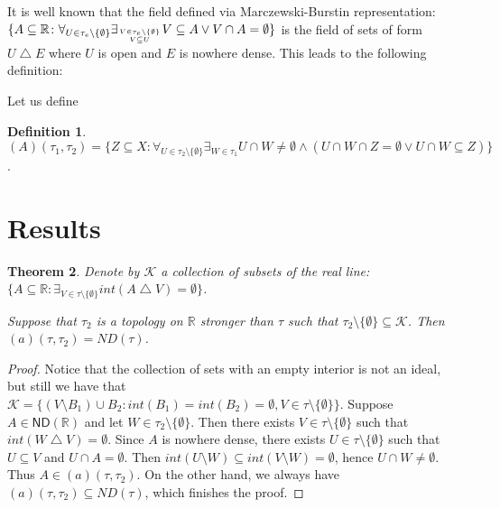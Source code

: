 \documentclass[12pt]{amsart}
\theoremstyle{plain}
\newtheorem{theorem}{Theorem}[section]
\theoremstyle{definition}
\newtheorem{definition}[theorem]{Definition}
\theoremstyle{remark}
\newcommand{\real}{\mathbb{R}}
\newcommand{\cK}{{\mathcal K}}
\newcommand{\mathint}{\mathit{int}}
\newcommand{\aideal}{\mathit{(a)}}
\newcommand{\topWithoutEmptyset}[1]{#1\setminus\lbrace\emptyset\rbrace}
\begin{document}
It is well known that the field defined via
Marczewski-Burstin representation:
$\lbrace A \subseteq \real\colon 
\forall_{U \in \tau_e \setminus \lbrace \emptyset \rbrace}
\exists_{V \in \tau_e \setminus \lbrace \emptyset \rbrace \atop V \subseteq U}
V \subseteq A \vee V \cap A = \emptyset\rbrace$
is the field of sets of form $U \bigtriangleup E$
where $U$ is open and $E$ is nowhere dense.
This leads to the following definition:

Let us define 
\begin{definition}
$(A)(\tau_1, \tau_2) = \{ Z \subseteq X \colon
\forall_{U \in \tau_2 \setminus \{ \emptyset\}}
\exists_{W \in \tau_1} U \cap W \not= \emptyset \wedge
(U \cap W \cap Z = \emptyset \vee U \cap W \subseteq Z)\}$.
\end{definition}

\section{Results}

\begin{theorem}
Denote by $\cK$ a collection of subsets of the real line:
$\lbrace A \subseteq \real \colon 
\exists_{V\in\tau\setminus\lbrace\emptyset\rbrace}  
\mathint (A \bigtriangleup V) = \emptyset\rbrace$.

Suppose that $\tau_2$ is a topology on $\real$ stronger than $\tau$ 
such that 
$\tau_2\setminus\lbrace \emptyset \rbrace \subseteq \cK$.
Then $\aideal(\tau, \tau_2) = ND(\tau)$.
\end{theorem}
									
\begin{proof}  
Notice that the collection of sets with an empty interior is not an ideal, but
still we have that $\cK = \lbrace (V \setminus B_1) \cup B_2\colon
\mathint(B_1) = \mathint(B_2) = \emptyset, 
V\in\topWithoutEmptyset{\tau}\rbrace$.
Suppose $A \in \mathsf{ND}(\real)$ and let $W \in \tau_2\setminus\lbrace \emptyset \rbrace$.
Then there exists $V\in\topWithoutEmptyset{\tau}$ such that
$\mathint (W \bigtriangleup V) = \emptyset$. Since $A$ is nowhere dense, there
exists $U \in \topWithoutEmptyset{\tau}$ such that
$U \subseteq V$ and $U \cap A = \emptyset$. Then
$\mathint(U \setminus W) \subseteq \mathint(V \setminus W) = \emptyset$,
hence $U \cap W \not= \emptyset$. Thus $A \in \aideal(\tau, \tau_2)$.
On the other hand, we always have $\aideal(\tau, \tau_2) \subseteq ND(\tau)$,
which finishes the proof.
\end{proof}
\end{document}
